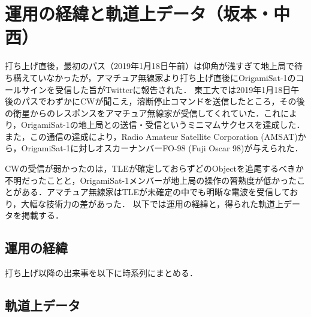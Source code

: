 \section{運用の経緯と軌道上データ（坂本・中西）}

打ち上げ直後，最初のパス（2019年1月18日午前）は仰角が浅すぎて地上局で待ち構えていなかったが，アマチュア無線家より打ち上げ直後にOrigamiSat-1のコールサインを受信した旨がTwitterに報告された．
東工大では2019年1月18日午後のパスでわずかにCWが聞こえ，溶断停止コマンドを送信したところ，その後の衛星からのレスポンスをアマチュア無線家が受信してくれていた．これにより，OrigamiSat-1の地上局との送信・受信というミニマムサクセスを達成した．また，この通信の達成により，Radio Amateur Satellite Corporation (AMSAT)から，OrigamiSat-1に対しオスカーナンバーFO-98 (Fuji Oscar 98)が与えられた．

CWの受信が弱かったのは，TLEが確定しておらずどのObjectを追尾するべきか不明だったことと，OrigamiSat-1メンバーが地上局の操作の習熟度が低かったことがある．アマチュア無線家はTLEが未確定の中でも明晰な電波を受信しており，大幅な技術力の差があった．
以下では運用の経緯と，得られた軌道上データを掲載する．

\subsection{運用の経緯}
打ち上げ以降の出来事を以下に時系列にまとめる．





\subsection{軌道上データ}

